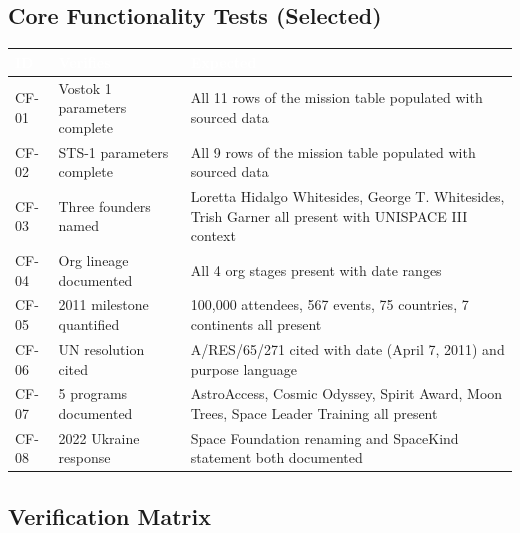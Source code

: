 \documentclass[11pt,letterpaper]{article}
\newcommand{\tableheader}[1]{\textbf{\sffamily\textcolor{white}{#1}}}
\begin{document}
\subsection{Core Functionality Tests (Selected)}

\begin{center}
\begin{tabularx}{\textwidth}{L{1.5cm}L{4cm}X}
\toprule
{}
\tableheader{ID} & \tableheader{Verifies} & \tableheader{Expected} \\
\midrule
CF-01 & Vostok 1 parameters complete & All 11 rows of the mission table populated with sourced data \\
CF-02 & STS-1 parameters complete & All 9 rows of the mission table populated with sourced data \\
CF-03 & Three founders named & Loretta Hidalgo Whitesides, George T. Whitesides, Trish Garner all present with UNISPACE III context \\
CF-04 & Org lineage documented & All 4 org stages present with date ranges \\
CF-05 & 2011 milestone quantified & 100,000 attendees, 567 events, 75 countries, 7 continents all present \\
CF-06 & UN resolution cited & A/RES/65/271 cited with date (April 7, 2011) and purpose language \\
CF-07 & 5 programs documented & AstroAccess, Cosmic Odyssey, Spirit Award, Moon Trees, Space Leader Training all present \\
CF-08 & 2022 Ukraine response & Space Foundation renaming and SpaceKind statement both documented \\
\bottomrule
\end{tabularx}
\end{center}

\subsection{Verification Matrix}
\end{document}
